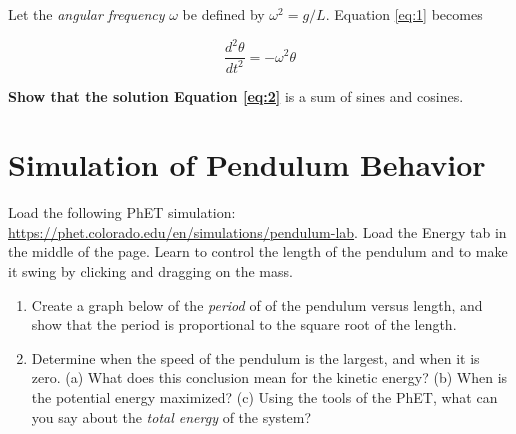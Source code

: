 \documentclass{article}
\begin{document}
Let the \textit{angular frequency} $\omega$ be defined by $\omega^2 = g/L$.  Equation \ref{eq:1} becomes

\begin{equation}
\frac{d^2 \theta}{dt^2} = -\omega^2\theta \label{eq:2}
\end{equation}

\textbf{Show that the solution Equation \ref{eq:2}} is a sum of sines and cosines.

\section{Simulation of Pendulum Behavior}

Load the following PhET simulation: \url{https://phet.colorado.edu/en/simulations/pendulum-lab}.  Load the Energy tab in the middle of the page.  Learn to control the length of the pendulum and to make it swing by clicking and dragging on the mass.

\begin{enumerate}
\item Create a graph below of the \textit{period} of of the pendulum versus length, and show that the period is proportional to the square root of the length. \\ \vspace{4cm}
\item Determine when the speed of the pendulum is the largest, and when it is zero.  (a) What does this conclusion mean for the kinetic energy?  (b) When is the potential energy maximized?  (c) Using the tools of the PhET, what can you say about the \textit{total energy} of the system?
\end{enumerate}
\end{document}
